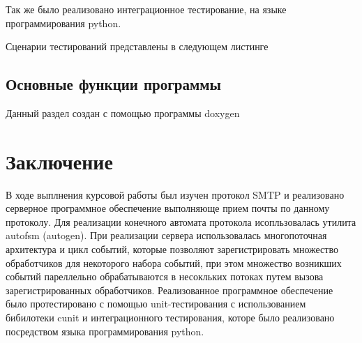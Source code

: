 \documentclass[a4paper,12pt]{report}
\begin{document}
		Так же было реализовано интеграционное тестирование, на языке программирования python.

		Сценарии тестирований представлены в следующем листинге





\section{Основные функции программы}

Данный раздел  создан с помощью программы doxygen



   



	



	\chapter*{Заключение}
	В ходе выплнения курсовой работы был изучен протокол SMTP и реализовано серверное программное обеспечение выполняюще прием почты по данному протоколу. Для реализации конечного автомата протокола исопльзовалась утилита autofsm (autogen). При реализации сервера использовалась многопоточная архитектура и цикл событий, которые позволяют зарегистрировать множество обработчиков для некоторого набора событий, при этом множество возникших событий пареллельно обрабатываются в несокльких потоках путем вызова зарегистрированных обработчиков. Реализованное программное обеспечение было протестировано с помощью unit-тестирования с использованием бибилотеки cunit и интеграционного тестирования, которе было реализовано посредством языка программирования python.



	\printbibliography
	
	\newpage
\end{document}
